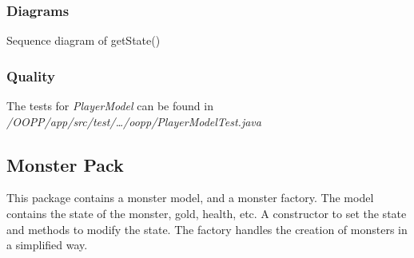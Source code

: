 \documentclass{article}
\begin{document}
\subsubsection{Diagrams}
\begin{center}
    Sequence diagram of getState()\\
\end{center}

\subsubsection{Quality}
The tests for \emph{PlayerModel} can be found in \emph{/OOPP/app/src/test/\ldots/oopp/PlayerModelTest.java}

\subsection{Monster Pack}
This package contains a monster model, and a monster factory. The model contains the state of the monster, gold, health, etc. A constructor to set the state and methods
to modify the state. The factory handles the creation of monsters in a simplified way.
\end{document}
